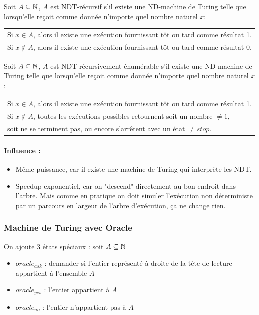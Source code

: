 \begin{mydef} Soit $A\subseteq \mathbb{N}$, $A$ est NDT-récursif s'il 
	existe une ND-machine de Turing telle que lorsqu'elle reçoit comme 
	donnée n'importe quel nombre naturel $x$:\\
	\begin{tabular}{l}
		Si $x\in A$, alors il existe une exécution fournissant tôt ou 
		tard comme résultat 1.\\
		Si $x\notin A$, alors il existe une exécution fournissant tôt ou 
		tard comme résultat 0.\\
	\end{tabular}
\end{mydef}

\begin{mydef} Soit $A\subseteq \mathbb{N}$, $A$ est 
	NDT-récursivement énumérable s'il 
	existe une ND-machine de Turing telle que lorsqu'elle reçoit comme 
	donnée n'importe quel nombre naturel $x$:\\
	\begin{tabular}{l}
		Si $x\in A$, alors il existe une exécution fournissant tôt ou 
		tard comme résultat 1.\\
		Si $x\notin A$, toutes les exécutions possibles retournent soit un 
		nombre $\neq 1$, \\
		soit ne se terminent pas, ou encore s'arrêtent avec 
		un état $\neq stop$.\\
	\end{tabular}
\end{mydef}

\paragraph{Influence :} 
\begin{itemize}
	\item Même puissance, car il existe une machine de Turing qui interprète
	 les NDT.
	\item Speedup exponentiel, car on "descend" directement au bon endroit 
		dans l'arbre. Mais comme en pratique on doit simuler 
		l'exécution non déterministe par un parcours en largeur de l'arbre d'exécution,
		 ça ne change rien.
\end{itemize}

\subsubsection{Machine de Turing avec Oracle}
On ajoute 3 états spéciaux : soit $A \subseteq \mathbb{N}$
\begin{itemize}
	\item $oracle_{ask}$ : demander si l'entier représenté à droite de la 
		tête de lecture appartient à l'ensemble $A$
	\item $oracle_{yes}$ : l'entier appartient à $A$
	\item $oracle_{no}$ :  l'entier n'appartient pas à $A$
\end{itemize}

